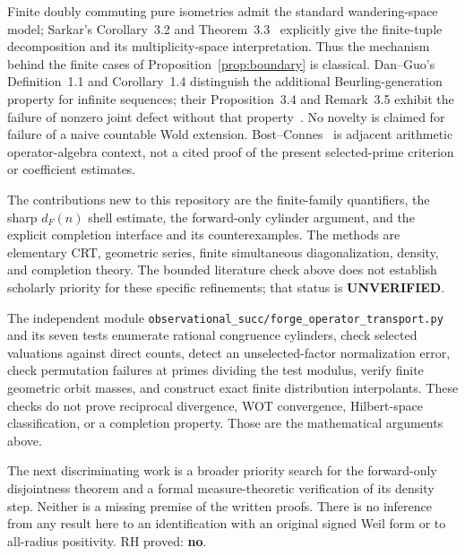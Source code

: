 \documentclass[11pt]{article}
\theoremstyle{remark}
\begin{document}
Finite doubly commuting pure isometries admit the standard wandering-space
model; Sarkar's Corollary~3.2 and Theorem~3.3~\cite{sarkar} explicitly give
the finite-tuple decomposition and its multiplicity-space interpretation.
Thus the mechanism behind the finite cases of
Proposition~\ref{prop:boundary} is classical.  Dan--Guo's
Definition~1.1 and Corollary~1.4 distinguish the additional
Beurling-generation property for infinite sequences; their
Proposition~3.4 and Remark~3.5 exhibit the failure of nonzero joint
defect without that property~\cite{danguo}.  No novelty is claimed for
failure of a naive countable Wold extension.  Bost--Connes~\cite{bc}
is adjacent arithmetic operator-algebra context, not a cited proof of
the present selected-prime criterion or coefficient estimates.

The contributions new to this repository are the finite-family
quantifiers, the sharp $d_F(n)$ shell estimate, the forward-only
cylinder argument, and the explicit completion interface and its
counterexamples.  The methods are elementary CRT, geometric series,
finite simultaneous diagonalization, density, and completion theory.
The bounded literature check above does not establish scholarly priority
for these specific refinements; that status is \textbf{UNVERIFIED}.

The independent module
\texttt{observational\_succ/forge\_operator\_transport.py} and its seven
tests enumerate rational congruence cylinders, check selected valuations
against direct counts, detect an unselected-factor normalization error,
check permutation failures at primes dividing the test modulus, verify
finite geometric orbit masses, and construct exact finite distribution
interpolants.  These checks do not prove reciprocal divergence, WOT
convergence, Hilbert-space classification, or a completion property.
Those are the mathematical arguments above.

The next discriminating work is a broader priority search for the
forward-only disjointness theorem and a formal measure-theoretic
verification of its density step.  Neither is a missing premise of
the written proofs.  There is no inference from any result here to an
identification with an original signed Weil form or to all-radius
positivity.  RH proved: \textbf{no}.
\end{document}
